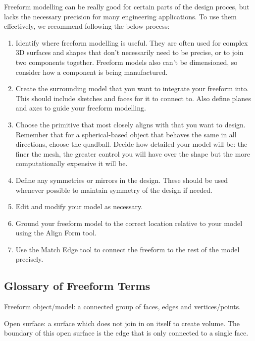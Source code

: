 Freeform modelling can be really good for certain parts of the design proces, but lacks the necessary precision for many engineering applications. To use them effectively, we recommend following the below process:

\begin{enumerate}

\item
Identify where freeform modelling is useful. They are often used for complex 3D surfaces and shapes that don't necessarily need to be precise, or to join two components together. Freeform models also can't be dimensioned, so consider how a component is being manufactured.

\item
Create the surrounding model that you want to integrate your freeform into. This should include sketches and faces for it to connect to. Also define planes and axes to guide your freeform modelling.

\item
Choose the primitive that most closely aligns with that you want to design. Remember that for a spherical-based object that behaves the same in all directions, choose the quadball. Decide how detailed your model will be: the finer the mesh, the greater control you will have over the shape but the more computationally expensive it will be.

\item
Define any symmetries or mirrors in the design. These should be used whenever possible to maintain symmetry of the design if needed.

\item 
Edit and modify your model as necessary.

\item 
Ground your freeform model to the correct location relative to your model using the Align Form tool.

\item 
Use the Match Edge tool to connect the freeform to the rest of the model precisely.
\end{enumerate}

\subsection{Glossary of Freeform Terms}

Freeform object/model: a connected group of faces, edges and vertices/points.

Open surface: a surface which does not join in on itself to create volume. The boundary of this open surface is the edge that is only connected to a single face.

